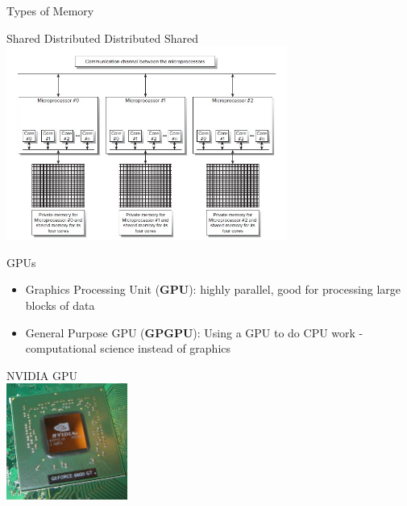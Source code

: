 \documentclass[xcolor=x11names,compress]{beamer}
\renewcommand{\(}{\begin{columns}}
\renewcommand{\)}{\end{columns}}
\newcommand{\<}[1]{\begin{column}{#1}}
\renewcommand{\>}{\end{column}}
\begin{document}
\begin{frame}{Types of Memory}

\begin{center}
Shared \hspace*{2 em} Distributed \hspace*{2 em} Distributed Shared
\includegraphics[height=2.5in,clip]{MemorySystems}
\end{center}

\end{frame}

\begin{frame}{GPUs}
\begin{itemize}
\item Graphics Processing Unit (\textbf{GPU}): highly parallel, good for processing large blocks of data
\item General Purpose GPU (\textbf{GPGPU}): Using a GPU to do CPU work - computational science instead of graphics
\end{itemize}

\begin{center}
NVIDIA GPU \\ \vspace*{1 em}
\includegraphics[height=1.5in,clip]{GPU}
\end{center}
\end{frame}
\end{document}
